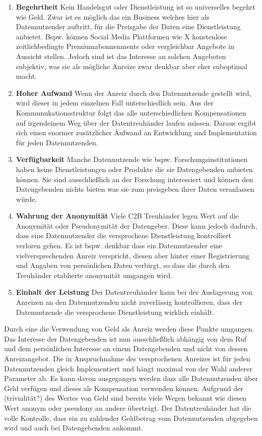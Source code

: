 \documentclass[11pt,a4paper]{scrreprt}
\begin{document}
\begin{enumerate}
    \item \textbf{Begehrtheit} Kein Handelsgut oder Dienstleistung ist so universelles begehrt wie Geld. Zwar ist es möglich das ein Business welches hier als Datennutzender auftritt, für die Preisgabe der Daten eine Dienstleistung anbietet. Bspw. können Social Media Plattformen wie X konstenlose zeitlichbedingte Premiumabonnenments oder vergleichbar Angebote in Aussicht stellen. Jedoch sind ist das Interesse an solchen Angeboten subjektiv, was sie als mögliche Anreize zwar denkbar aber eher suboptimal macht.
    \item \textbf{Hoher Aufwand} Wenn der Anreiz durch den Datennutzende gestellt wird, wird dieser in jedem einzelnen Fall unterschiedlich sein. Aus der Kommunukationsstruktur folgt das alle unterschiedlichen Kompensationen auf irgendeinem Weg über der Datentreuhänder laufen müssen. Daraus ergibt sich einen enormer zusätzlicher Aufwand an Entwicklung und Implementation für jeden Datennutzenden.
    \item \textbf{Verfügbarkeit} Manche Datennutzende wie bspw. Forschungsinstitutionen haben keine Dienstleistungen oder Produkte die sie Datengebenden anbieten können. Sie sind ausschließlich an der Forschung interessiert und können den Datengebenden nichts bieten was sie zum preisgeben ihrer Daten veranlassen würde.
    \item \textbf{Wahrung der Anonymität} Viele C2B Treuhänder legen Wert auf die Anonymität oder Pseudonymität der Datengeber. Diese kann jedoch dadurch, dass eine Datennutzender die versprochene Dienstleistung kontrolliert verloren gehen. Es ist bspw. denkbar dass ein Datennutzender eine vielversprechenden Anreiz verspricht, diesen aber hinter einer Registrierung und Angaben von persönlichen Daten verbirgt, so dass die durch den Treuhänder etablierte anonymität umgangen wird.
    \item \textbf{Einhalt der Leistung} Der Datentreuhänder kann bei der Auslagerung von Anreizen an den Datennutzenden nicht zuverlässig kontrollieren, dass der Datennutzende die versprochene Dienstleistung wirklich einhält.
\end{enumerate}
Durch eine die Verwendung von Geld als Anreiz werden diese Punkte umgangen. Das Interesse der Datengebenden ist nun ausschließlich abhängig von dem Ruf und dem persönlichen Interesse an einem Datengebenden und nicht von dessen Anreizangebot. Die in Anspruchnahme des versprochenen Anreizes ist für jeden Datennutzenden gleich Implementiert und hängt maximal von der Wahl anderer Parameter ab. Es kann davon ausgegangen werden dass alle Datennutzenden über Geld verfügen und dieses als Kompensation verwenden können. Aufgrund der (trivialität?) des Wertes von Geld sind bereits viele Wegen bekannt wie diesen Wert anonym oder pseudony an andere überträgt. Der Datentreuhänder hat die volle Kontrolle, dass ein zu zahlender Geldbetrag vom Datennutzenden abgegeben wird und auch bei Datengebenden ankommt.
 
\end{document}
